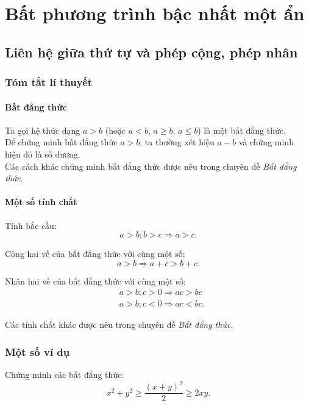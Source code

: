 \chapter{Bất phương trình bậc nhất một ẩn}
\section{Liên hệ giữa thứ tự và phép cộng, phép nhân}
\subsection{Tóm tắt lí thuyết}
\subsubsection{Bất đẳng thức}
Ta gọi hệ thức dạng $a>b$ (hoặc $a<b$, $a\ge b$, $a\le b$) là một bất đẳng thức.\\
Để chứng minh bất đẳng thức $a>b$, ta thường xét hiệu $a-b$ và chứng minh hiệu đó là số dương.\\
Các cách khác chứng minh bất đẳng thức được nêu trong chuyên đề \textit{Bất đẳng thức}.
\subsubsection{Một số tính chất}
\begin{tc}
Tính bắc cầu: \[a>b;b>c\Rightarrow a>c.\]
\end{tc}
\begin{tc}
Cộng hai vế của bất đẳng thức với cùng một số: \[a>b\Rightarrow a+c>b+c.\]
\end{tc}
\begin{tc}
Nhân hai vế của bất đẳng thức với cùng một số: 
\begin{align*}
&a>b;c>0\Rightarrow ac>bc\\ 
&a>b;c<0\Rightarrow ac<bc.
\end{align*}
\end{tc}
Các tính chất khác được nêu trong chuyên đề \textit{Bất đẳng thức}.
\subsection{Một số ví dụ}
\begin{vd}%
Chứng minh các bất đẳng thức:
\[x^2+y^2\ge \dfrac{\left(x+y\right)^2}{2}\ge 2xy.\]
\end{vd}

